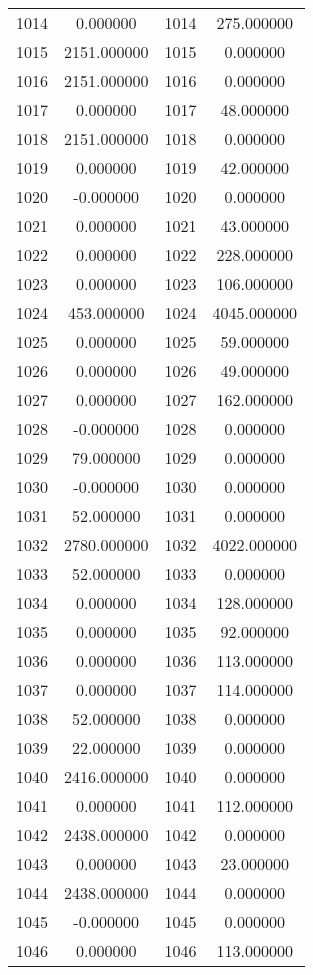 \documentclass[12pt]{article}
\begin{document}
\begin{longtable}{@{}cccc@{}}
1014 & 0.000000 & 1014 & 275.000000 \\
1015 & 2151.000000 & 1015 & 0.000000 \\
1016 & 2151.000000 & 1016 & 0.000000 \\
1017 & 0.000000 & 1017 & 48.000000 \\
1018 & 2151.000000 & 1018 & 0.000000 \\
1019 & 0.000000 & 1019 & 42.000000 \\
1020 & -0.000000 & 1020 & 0.000000 \\
1021 & 0.000000 & 1021 & 43.000000 \\
1022 & 0.000000 & 1022 & 228.000000 \\
1023 & 0.000000 & 1023 & 106.000000 \\
1024 & 453.000000 & 1024 & 4045.000000 \\
1025 & 0.000000 & 1025 & 59.000000 \\
1026 & 0.000000 & 1026 & 49.000000 \\
1027 & 0.000000 & 1027 & 162.000000 \\
1028 & -0.000000 & 1028 & 0.000000 \\
1029 & 79.000000 & 1029 & 0.000000 \\
1030 & -0.000000 & 1030 & 0.000000 \\
1031 & 52.000000 & 1031 & 0.000000 \\
1032 & 2780.000000 & 1032 & 4022.000000 \\
1033 & 52.000000 & 1033 & 0.000000 \\
1034 & 0.000000 & 1034 & 128.000000 \\
1035 & 0.000000 & 1035 & 92.000000 \\
1036 & 0.000000 & 1036 & 113.000000 \\
1037 & 0.000000 & 1037 & 114.000000 \\
1038 & 52.000000 & 1038 & 0.000000 \\
1039 & 22.000000 & 1039 & 0.000000 \\
1040 & 2416.000000 & 1040 & 0.000000 \\
1041 & 0.000000 & 1041 & 112.000000 \\
1042 & 2438.000000 & 1042 & 0.000000 \\
1043 & 0.000000 & 1043 & 23.000000 \\
1044 & 2438.000000 & 1044 & 0.000000 \\
1045 & -0.000000 & 1045 & 0.000000 \\
1046 & 0.000000 & 1046 & 113.000000 \\

\end{longtable}
\end{document}
